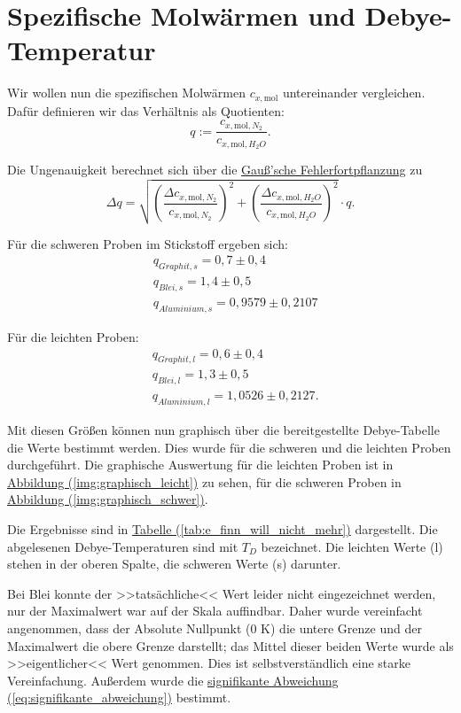 \onecolumn
\twocolumn
\newpage
\section{Spezifische Molwärmen und Debye-Temperatur}
Wir wollen nun die spezifischen Molwärmen $c_{x,\mathrm{mol}}$ untereinander vergleichen. Dafür definieren wir das Verhältnis als Quotienten:
\begin{equation}
    q := \frac{c_{x,\mathrm{mol},N_2}}{c_{x,\mathrm{mol},H_2O}}.
\end{equation}

Die Ungenauigkeit berechnet sich über die \hyperref[eq:gauss_fehlfortpflanzung]{Gauß'sche Fehlerfortpflanzung} zu 
\begin{equation}
    \Delta q = \sqrt{\left(\frac{\Delta c_{x,\mathrm{mol},N_2}}{c_{x,\mathrm{mol},N_2}}\right)^2 + \left(\frac{\Delta c_{x,\mathrm{mol},H_2O}}{c_{x,\mathrm{mol},H_2O}}\right)^2} \cdot q.
\end{equation}

Für die schweren Proben im Stickstoff ergeben sich:
\begin{align}
    &q_{Graphit,s} = 0,7 \pm 0,4 \\
    &q_{Blei,s} = 1,4 \pm 0,5 \\
    &q_{Aluminium,s} = 0,9579 \pm 0,2107
\end{align}

Für die leichten Proben:
\begin{align}
    &\boxed{q_{Graphit,l} = 0,6 \pm 0,4} \\
    &\boxed{q_{Blei,l} = 1,3 \pm 0,5} \\
    &\boxed{q_{Aluminium,l} = 1,0526 \pm 0,2127}.
\end{align}

Mit diesen Größen können nun graphisch über die bereitgestellte Debye-Tabelle die Werte bestimmt werden.
Dies wurde für die schweren und die leichten Proben durchgeführt. Die graphische Auswertung für die leichten Proben ist in \hyperref[img:graphisch_leicht]{Abbildung (\ref*{img:graphisch_leicht})} zu sehen, für die schweren Proben in \hyperref[img:graphisch_schwer]{Abbildung (\ref*{img:graphisch_schwer})}.

Die Ergebnisse sind in \hyperref[tab:e_finn_will_nicht_mehr]{Tabelle (\ref*{tab:e_finn_will_nicht_mehr})} dargestellt. Die abgelesenen Debye-Temperaturen sind mit $T_D$ bezeichnet.
Die leichten Werte (l) stehen in der oberen Spalte, die schweren Werte (s) darunter.

Bei Blei konnte der >>tatsächliche<< Wert leider nicht eingezeichnet werden, nur der Maximalwert war auf der Skala auffindbar.
Daher wurde vereinfacht angenommen, dass der Absolute Nullpunkt (0 K) die untere Grenze und der Maximalwert die obere Grenze darstellt; das Mittel dieser beiden Werte wurde als >>eigentlicher<< Wert genommen. Dies ist selbstverständlich eine starke Vereinfachung.
Außerdem wurde die \hyperref[eq:signifikante_abweichung]{signifikante Abweichung (\ref*{eq:signifikante_abweichung})} bestimmt.


